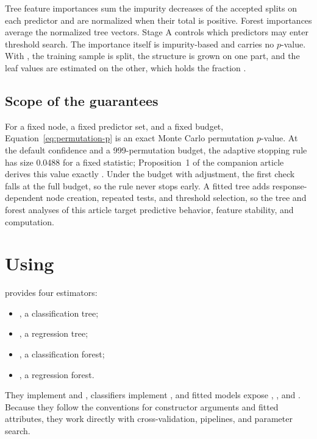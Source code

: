 \documentclass[article]{jss}
\newcommand{\citrees}{\pkg{citrees}\xspace}
\newcommand{\sklearn}{\pkg{scikit-learn}\xspace}
\begin{document}
Tree feature importances sum the impurity decreases of the accepted splits on
each predictor and are normalized when their total is positive. Forest
importances average the normalized tree vectors. Stage A controls which
predictors may enter threshold search. The importance itself is impurity-based
and carries no $p$-value. With , the training sample is
split, the structure is grown on one part, and the leaf values are estimated on
the other, which holds the fraction 
\citep{Wager+Athey:2018}.

\subsection{Scope of the guarantees} \label{sec:scope}

For a fixed node, a fixed predictor set, and a fixed budget,
Equation~\ref{eq:permutation-p} is an exact Monte Carlo permutation $p$-value.
At the default confidence and a 999-permutation budget, the adaptive stopping
rule has size 0.0488 for a fixed statistic; Proposition~1 of the companion
article derives this value exactly \citep{Milletich+Downes+Goley+Hirst:2026}.
Under the  budget with adjustment, the first check falls at the
full budget, so the rule never stops early. A fitted tree adds
response-dependent node creation, repeated tests, and threshold selection, so
the tree and forest analyses of this article target predictive behavior,
feature stability, and computation.

\section[Using citrees]{Using \citrees} \label{sec:software}

\citrees provides four estimators:
\begin{itemize}
\item {}, a classification tree;
\item {}, a regression tree;
\item {}, a classification forest;
\item {}, a regression forest.
\end{itemize}
They implement  and , classifiers implement
, and fitted models expose ,
, and . Because they follow
the \sklearn conventions for constructor arguments and fitted attributes, they
work directly with \sklearn cross-validation, pipelines, and parameter search.
\end{document}
